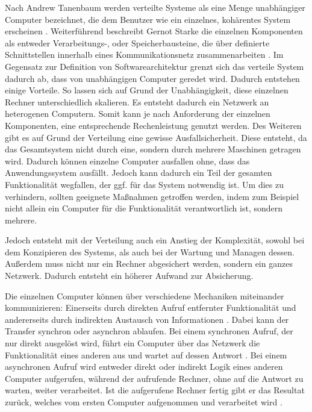 Nach Andrew Tanenbaum werden verteilte Systeme als eine Menge unabhängiger Computer bezeichnet, die dem Benutzer wie ein einzelnes, kohärentes System erscheinen \parencite{tanenbaum_verteilte_2007}. Weiterführend beschreibt Gernot Starke die einzelnen Komponenten als entweder Verarbeitungs-, oder Speicherbausteine, die über definierte Schnittstellen innerhalb eines Kommunikationsnetz zusammenarbeiten \parencite[vlg.][S. 116]{starke_effektive_2015}. Im Gegensatz zur Definition von Softwarearchitektur grenzt sich das verteile System dadurch ab, dass von unabhängigen Computer geredet wird. Dadurch entstehen einige Vorteile. So lassen sich auf Grund der Unabhängigkeit, diese einzelnen Rechner unterschiedlich skalieren. Es entsteht dadurch ein Netzwerk an heterogenen Computern. Somit kann je nach Anforderung der einzelnen Komponenten, eine entsprechende Rechenleistung genutzt werden. Des Weiteren gibt es auf Grund der Verteilung eine gewisse Ausfallsicherheit. Diese entsteht, da das Gesamtsystem nicht durch eine, sondern durch mehrere Maschinen getragen wird. Dadurch können einzelne Computer ausfallen ohne, dass das Anwendungssystem ausfällt. Jedoch kann dadurch ein Teil der gesamten Funktionalität wegfallen, der ggf. für das System notwendig ist. Um dies zu verhindern, sollten geeignete Maßnahmen getroffen werden, indem zum Beispiel nicht allein ein Computer für die Funktionalität verantwortlich ist, sondern mehrere.

Jedoch entsteht mit der Verteilung auch ein Anstieg der Komplexität, sowohl bei dem Konzipieren des Systems, als auch bei der Wartung und Managen dessen. Außerdem muss nicht nur ein Rechner abgesichert werden, sondern ein ganzes Netzwerk. Dadurch entsteht ein höherer Aufwand zur Absicherung.

Die einzelnen Computer können über verschiedene Mechaniken miteinander kommunizieren: Einerseits durch direkten Aufruf entfernter Funktionalität und andererseits durch indirekten Austausch von Informationen \parencite[vlg.][S. 116]{starke_effektive_2015}. Dabei kann der Transfer synchron oder asynchron ablaufen. Bei einem synchronen Aufruf, der nur direkt ausgelöst wird, führt ein Computer über das Netzwerk die Funktionalität eines anderen aus und wartet auf dessen Antwort \parencite{synchrone_2018}.
Bei einem asynchronen Aufruf wird entweder direkt oder indirekt Logik eines anderen Computer aufgerufen, während der aufrufende Rechner, ohne auf die Antwort zu warten, weiter verarbeitet. Ist die aufgerufene Rechner fertig gibt er das Resultat zurück, welches vom ersten Computer aufgenommen und verarbeitet wird \parencite{wiki_asynchrone_2019}.

